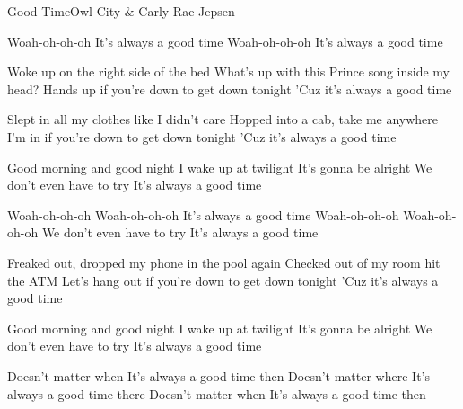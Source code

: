 \begin{Song}{Good Time}{Owl City \& Carly Rae Jepsen}
\begin{multicols}{2}

\begin{Chorus}
Woah-oh-oh-oh
It's always a good time
Woah-oh-oh-oh
It's always a good time
\end{Chorus}
\espaceInterStrophe

\begin{Verse}
Woke up on the right side of the bed
What's up with this Prince song inside my head?
Hands up if you're down to get down tonight
'Cuz it's always a good time
\espaceInterStrophe

Slept in all my clothes like I didn't care
Hopped into a cab, take me anywhere
I'm in if you're down to get down tonight
'Cuz it's always a good time
\end{Verse}
\espaceInterStrophe

\begin{PreChorus}
Good morning and good night
I wake up at twilight
It's gonna be alright
We don't even have to try
It's always a good time
\end{PreChorus}
\espaceInterStrophe

\begin{Chorus}
Woah-oh-oh-oh Woah-oh-oh-oh
It's always a good time
Woah-oh-oh-oh Woah-oh-oh-oh
We don't even have to try
It's always a good time
\end{Chorus}
\columnbreak

\begin{Verse}
Freaked out, dropped my phone in the pool again
Checked out of my room hit the ATM
Let's hang out if you're down to get down tonight
'Cuz it's always a good time
\end{Verse}
\espaceInterStrophe

\begin{PreChorus}
Good morning and good night
I wake up at twilight
It's gonna be alright
We don't even have to try
It's always a good time
\end{PreChorus}
\espaceInterStrophe

\tochorus[x2]
\espaceInterStrophe

\begin{Bridge}
Doesn't matter when
It's always a good time then
Doesn't matter where
It's always a good time there
Doesn't matter when
It's always a good time then
\end{Bridge}
\espaceInterStrophe

\tochorus\\
\adlib
\vfill
~
\end{multicols}


\end{Song}
